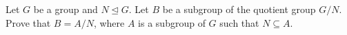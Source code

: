 \newpage

\begin{problem}\label{problem-subgroup-of-quotient-group-is-quotient-group}
    Let $G$ be a group and $N \unlhd G$. Let $B$ be a subgroup of the quotient group $G/N$. Prove that $B = A/N$, where $A$ is a subgroup of $G$ such that $N \subseteq A$.
\end{problem}





